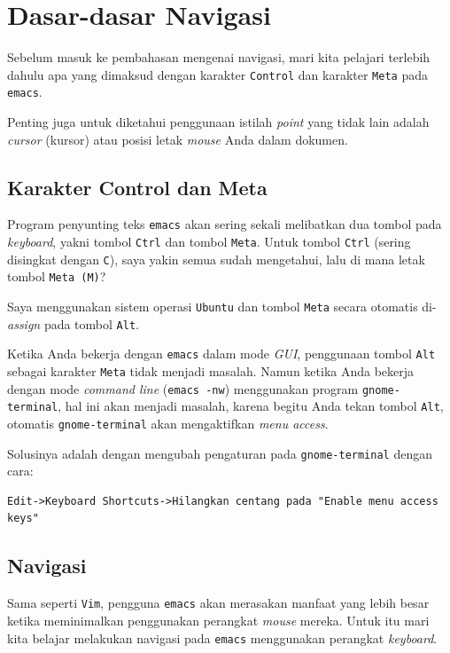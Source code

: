 \documentclass{article}
\begin{document}
\section{Dasar-dasar Navigasi}
Sebelum masuk ke pembahasan mengenai navigasi, mari kita
pelajari terlebih dahulu apa yang dimaksud dengan karakter
\verb=Control= dan karakter \verb=Meta= pada \verb=emacs=.

Penting juga untuk diketahui penggunaan istilah \emph{point} yang tidak 
lain adalah \emph{cursor} (kursor) atau posisi letak \emph{mouse} Anda dalam
dokumen.

\subsection{Karakter Control dan Meta}
Program penyunting teks \verb=emacs= akan sering sekali
melibatkan dua tombol pada \emph{keyboard}, yakni tombol
\verb=Ctrl= dan tombol \verb=Meta=. Untuk tombol \verb=Ctrl=
(sering disingkat dengan \verb=C=), saya yakin semua sudah
mengetahui, lalu di mana letak tombol \verb=Meta (M)=?

Saya menggunakan sistem operasi \verb=Ubuntu= dan tombol
\verb=Meta= secara otomatis di-\emph{assign} pada tombol
\verb=Alt=.

Ketika Anda bekerja dengan \verb=emacs= dalam mode \emph{GUI},
penggunaan tombol \verb=Alt= sebagai karakter \verb=Meta= 
tidak menjadi masalah. Namun ketika Anda bekerja dengan mode
\emph{command line} (\verb=emacs -nw=) menggunakan program 
\verb=gnome-terminal=, hal ini akan menjadi masalah, karena 
begitu Anda tekan tombol \verb=Alt=, 
otomatis \verb=gnome-terminal= akan mengaktifkan \emph{menu access}.

Solusinya adalah dengan mengubah pengaturan pada 
\verb=gnome-terminal= dengan cara:

\begin{verbatim}
Edit->Keyboard Shortcuts->Hilangkan centang pada "Enable menu access keys"
\end{verbatim}

\subsection{Navigasi}

Sama seperti \verb=Vim=, pengguna \verb=emacs= akan
merasakan manfaat yang lebih besar ketika meminimalkan
penggunakan perangkat \emph{mouse} mereka. Untuk itu mari kita
belajar melakukan navigasi pada \verb=emacs= menggunakan
perangkat \emph{keyboard}.
\end{document}
